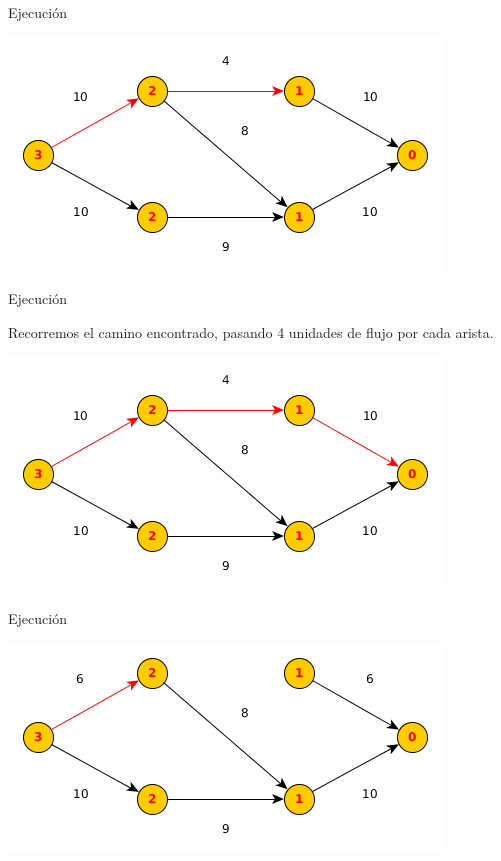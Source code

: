 \documentclass{beamer}
\begin{document}
\begin{frame}{Ejecución}

    
    \includegraphics[scale=0.6]{dinitz/dinitz5.png}
    
\end{frame}

\begin{frame}{Ejecución}

    Recorremos el camino encontrado, pasando 4 unidades de flujo por cada arista.
    
    \includegraphics[scale=0.6]{dinitz/dinitz6.png}
    
\end{frame}

\begin{frame}{Ejecución}

    
    \includegraphics[scale=0.6]{dinitz/dinitz7.png}
    
\end{frame}
\end{document}
